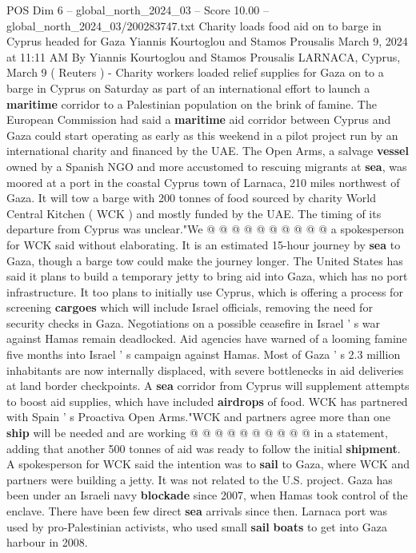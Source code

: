 \begin{textsample}{POS Dim 6 – global\_north\_2024\_03 – Score 10.00 – global\_north\_2024\_03/200283747.txt}  \label{ex:f6_pos_057}
Charity loads food aid on to barge in Cyprus headed for Gaza Yiannis Kourtoglou and Stamos Prousalis March 9, 2024 at 11:11 AM By Yiannis Kourtoglou and Stamos Prousalis LARNACA, Cyprus, March 9 ( Reuters ) - Charity workers loaded relief supplies for Gaza on to a barge in Cyprus on Saturday as part of an international effort to launch a \textbf{maritime} corridor to a Palestinian population on the brink of famine.
The European Commission had said a \textbf{maritime} aid corridor between Cyprus and Gaza could start operating as early as this weekend in a pilot project run by an international charity and financed by the UAE.
The Open Arms, a salvage \textbf{vessel} owned by a Spanish NGO and more accustomed to rescuing migrants at \textbf{sea}, was moored at a port in the coastal Cyprus town of Larnaca, 210 miles northwest of Gaza.
It will tow a barge with 200 tonnes of food sourced by charity World Central Kitchen ( WCK ) and mostly funded by the UAE.
The timing of its departure from Cyprus was unclear."We @ @ @ @ @ @ @ @ @ @ a spokesperson for WCK said without elaborating.
It is an estimated 15-hour journey by \textbf{sea} to Gaza, though a barge tow could make the journey longer.
The United States has said it plans to build a temporary jetty to bring aid into Gaza, which has no port infrastructure.
It too plans to initially use Cyprus, which is offering a process for screening \textbf{cargoes} which will include Israel officials, removing the need for security checks in Gaza.
Negotiations on a possible ceasefire in Israel ' s war against Hamas remain deadlocked.
Aid agencies have warned of a looming famine five months into Israel ' s campaign against Hamas.
Most of Gaza ' s 2.3 million inhabitants are now internally displaced, with severe bottlenecks in aid deliveries at land border checkpoints.
A \textbf{sea} corridor from Cyprus will supplement attempts to boost aid supplies, which have included \textbf{airdrops} of food.
WCK has partnered with Spain ' s Proactiva Open Arms."WCK and partners agree more than one \textbf{ship} will be needed and are working @ @ @ @ @ @ @ @ @ @ in a statement, adding that another 500 tonnes of aid was ready to follow the initial \textbf{shipment}.
A spokesperson for WCK said the intention was to \textbf{sail} to Gaza, where WCK and partners were building a jetty.
It was not related to the U.S. project.
Gaza has been under an Israeli navy \textbf{blockade} since 2007, when Hamas took control of the enclave.
There have been few direct \textbf{sea} arrivals since then.
Larnaca port was used by pro-Palestinian activists, who used small \textbf{sail} \textbf{boats} to get into Gaza harbour in 2008.

\end{textsample}
